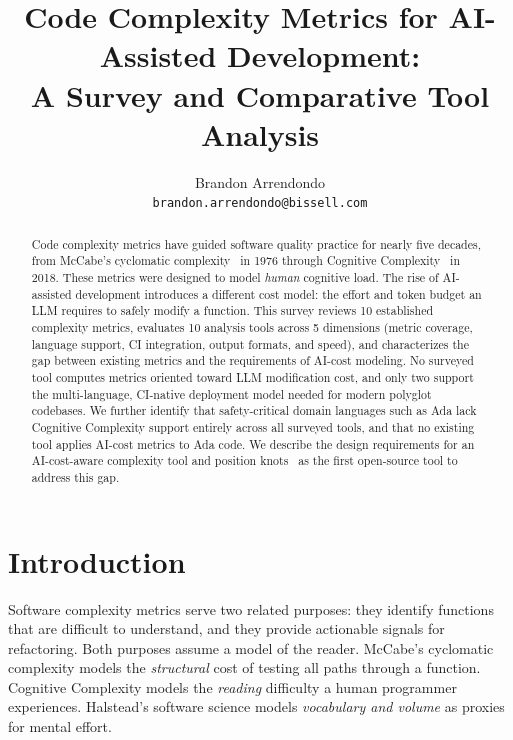 \documentclass[10pt,twocolumn,letterpaper]{article}
\begin{document}
\title{Code Complexity Metrics for AI-Assisted Development:\\
A Survey and Comparative Tool Analysis}

\author{Brandon Arrendondo\\
{\tt\small brandon.arrendondo@bissell.com}}

\maketitle

\begin{abstract}
Code complexity metrics have guided software quality practice for nearly
five decades, from McCabe's cyclomatic complexity~\cite{mccabe} in 1976
through Cognitive Complexity~\cite{cognitive-complexity} in 2018.  These
metrics were designed to model \emph{human} cognitive load.  The rise of
AI-assisted development introduces a different cost model: the effort and
token budget an LLM requires to safely modify a function.  This survey
reviews 10 established complexity metrics, evaluates 10 analysis tools
across 5 dimensions (metric coverage, language support, CI integration,
output formats, and speed), and characterizes the gap between existing
metrics and the requirements of AI-cost modeling.  No surveyed tool
computes metrics oriented toward LLM modification cost, and only two
support the multi-language, CI-native deployment model needed for modern
polyglot codebases.  We further identify that safety-critical domain
languages such as Ada lack Cognitive Complexity support entirely across
all surveyed tools, and that no existing tool applies AI-cost metrics to
Ada code.  We describe the design requirements for an AI-cost-aware
complexity tool and position knots~\cite{knots} as the first open-source
tool to address this gap.
\end{abstract}

\section{Introduction}
\label{sec:intro}

Software complexity metrics serve two related purposes: they identify
functions that are difficult to understand, and they provide actionable
signals for refactoring.  Both purposes assume a model of the reader.
McCabe's cyclomatic complexity models the \emph{structural} cost of
testing all paths through a function.  Cognitive Complexity models the
\emph{reading} difficulty a human programmer experiences.  Halstead's
software science models \emph{vocabulary and volume} as proxies for
mental effort.
\end{document}
